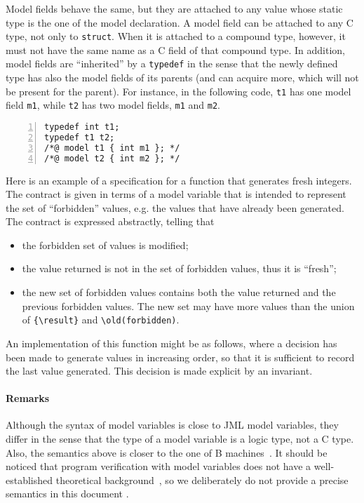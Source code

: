 Model fields behave the same, but they are attached to any value whose static
type is the one of the model declaration. A model field can be attached to any
C type, not only to \texttt{struct}. When it is attached to a compound type,
however, it must not have the same name as a C field of that compound type.
In addition, model fields are ``inherited'' by a \texttt{typedef} 
in the sense that the newly defined type has also the model fields of its
parents (and can acquire more, which will not be present for the parent).
For instance, in the following code, \texttt{t1} has one model field
\texttt{m1}, while \texttt{t2} has two model fields,
\texttt{m1} and \texttt{m2}.
\begin{lstlisting}[style=c,basicstyle=\lp@basic,numbers=left]
typedef int t1;
typedef t1 t2;
/*@ model t1 { int m1 }; */
/*@ model t2 { int m2 }; */
\end{lstlisting}

\begin{example}\label{ex:model}
  Here is an example of a specification for a function that generates
  fresh integers. The contract is given in terms of a model variable
  that is intended to represent the set of ``forbidden'' values,
  e.g. the values that have already been generated.
  The contract is expressed abstractly, telling that
  \begin{itemize}
  \item the forbidden set of values is modified;
  \item the value returned is not in the set of forbidden values, thus
    it is ``fresh'';
  \item the new set of forbidden values contains both the value
    returned and the previous forbidden values.
    The new set may have more values than the union of \lstinline|{\result}| 
    and \lstinline|\old(forbidden)|.
  \end{itemize}
  An implementation of this function might be as follows, where a
  decision has been made to generate values in increasing order, so
  that it is sufficient to record the last value generated. This decision
  is made explicit by an invariant.
\end{example}

\paragraph{Remarks}

Although the syntax of model variables is close to JML model
variables, they differ in the sense that the type of a model variable
is a logic type, not a C type. Also, the semantics above is closer to
the one of B machines~\cite{abrial96:_b_book}. It should be noticed
that program verification with model variables does not have a
well-established theoretical background~\cite{marche07,leavens07}, so
we deliberately do not provide a precise semantics in this document .



